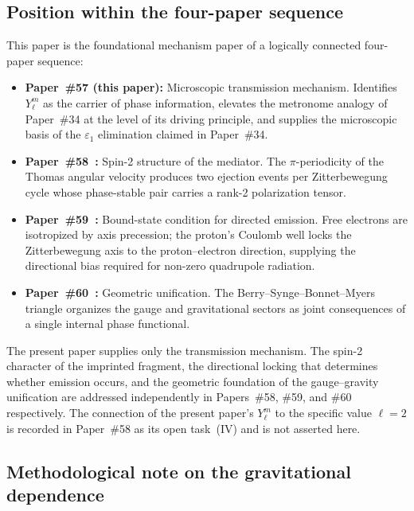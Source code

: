 \documentclass[%
 reprint, amsmath,amssymb, aps, prb, ]{revtex4-2}
\numberwithin{equation}{section}
\begin{document}
\subsection{Position within the four-paper sequence}

This paper is the foundational mechanism paper of a logically connected four-paper sequence:

\begin{itemize}[leftmargin=2em, itemsep=2pt]
\item \textbf{Paper~\#57 (this paper):} Microscopic transmission mechanism. Identifies $Y_\ell^m$ as the carrier of phase information, elevates the metronome analogy of Paper~\#34 at the level of its driving principle, and supplies the microscopic basis of the $\varepsilon_1$ elimination claimed in Paper~\#34.
\item \textbf{Paper~\#58~\cite{hanamura58}:} Spin-2 structure of the mediator. The $\pi$-periodicity of the Thomas angular velocity produces two ejection events per Zitterbewegung cycle whose phase-stable pair carries a rank-2 polarization tensor.
\item \textbf{Paper~\#59~\cite{hanamura59}:} Bound-state condition for directed emission. Free electrons are isotropized by axis precession; the proton's Coulomb well locks the Zitterbewegung axis to the proton--electron direction, supplying the directional bias required for non-zero quadrupole radiation.
\item \textbf{Paper~\#60~\cite{hanamura60}:} Geometric unification. The Berry--Synge--Bonnet--Myers triangle organizes the gauge and gravitational sectors as joint consequences of a single internal phase functional.
\end{itemize}

The present paper supplies only the transmission mechanism. The spin-2 character of the imprinted fragment, the directional locking that determines whether emission occurs, and the geometric foundation of the gauge--gravity unification are addressed independently in Papers~\#58, \#59, and \#60 respectively. The connection of the present paper's $Y_\ell^m$ to the specific value $\ell = 2$ is recorded in Paper~\#58 as its open task~(IV) and is not asserted here.

\subsection{Methodological note on the gravitational dependence}
\end{document}
